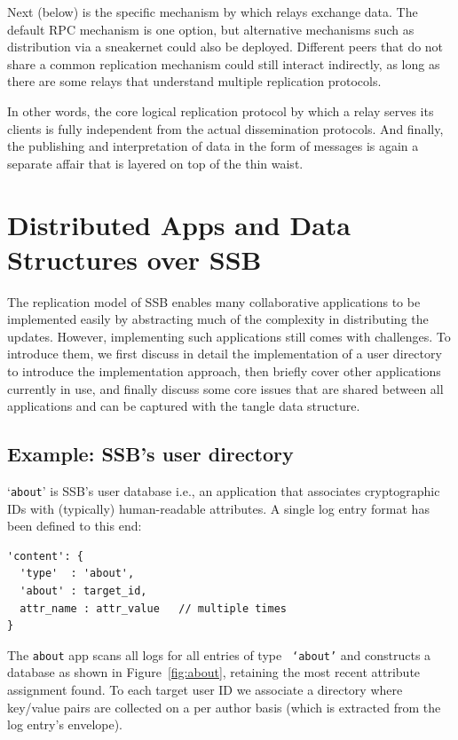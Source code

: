 \documentclass[9pt,sigconf,rewiew]{acmart}
\begin{document}
Next (below) is the specific mechanism by which relays exchange data. The default RPC mechanism is one option, but alternative mechanisms such as distribution via a sneakernet could also be deployed. Different peers that do not share a common replication mechanism could still interact indirectly, as long as there are some relays that understand multiple replication protocols.

In other words, the core logical replication protocol by which a relay serves its clients is fully independent from the actual dissemination protocols. And finally, the publishing and interpretation of data in the form of messages is again a separate affair that is layered on top of the thin waist.

\section{Distributed Apps and Data Structures over SSB}
\label{sect:apps}

The replication model of SSB enables many collaborative applications to be implemented easily by abstracting much of the complexity in distributing the updates. However, implementing such applications still comes with challenges. To introduce them, we first discuss in detail the implementation of a user directory to introduce the implementation approach, then briefly cover other applications currently in use, and finally discuss some core issues that are shared between all applications and can be captured with the tangle data structure.

\subsection{Example: SSB's user directory}
\label{ssect:about}

`{\small\tt about}' is SSB's user database i.e., an application that
associates cryptographic IDs with (typically) human-readable
attributes. A single log entry format has been defined to this end:
{\small\begin{verbatim}
'content': {
  'type'  : 'about',
  'about' : target_id,
  attr_name : attr_value   // multiple times
}
\end{verbatim}}

\noindent
The {\small\tt about} app scans all logs for all entries of type {\small\tt
  `about'} and constructs a database as shown in
Figure~\ref{fig:about}, retaining the most recent attribute assignment
found.  To each target user ID we associate a directory where
key/value pairs are collected on a per author basis (which is extracted
from the log entry's envelope).
\end{document}
